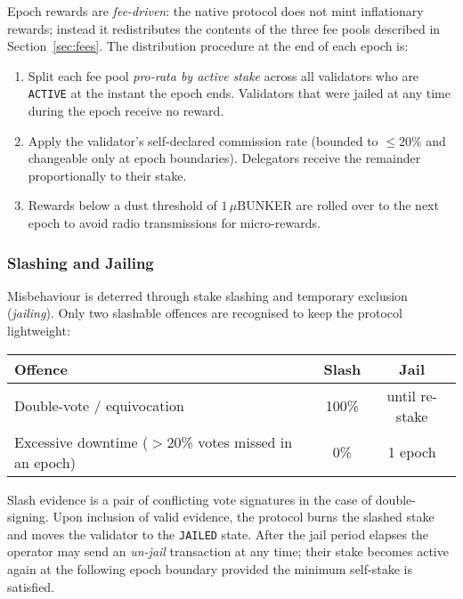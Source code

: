 \documentclass{article}
\begin{document}
Epoch rewards are \emph{fee-driven}: the native protocol does not mint inflationary rewards; instead it redistributes the contents of the three fee pools described in Section~\ref{sec:fees}.  The distribution procedure at the end of each epoch is:

\begin{enumerate}
    \item Split each fee pool \emph{pro-rata by active stake} across all validators who are \texttt{ACTIVE} at the instant the epoch ends.  Validators that were jailed at any time during the epoch receive no reward.
    \item Apply the validator’s self-declared commission rate (bounded to $\le 20\%$ and changeable only at epoch boundaries).  Delegators receive the remainder proportionally to their stake.
    \item Rewards below a dust threshold of $1\,\mu$BUNKER are rolled over to the next epoch to avoid radio transmissions for micro-rewards.
\end{enumerate}

\subsubsection{Slashing and Jailing}
\label{sec:slashing}

Misbehaviour is deterred through stake slashing and temporary exclusion (\emph{jailing}).  Only two slashable offences are recognised to keep the protocol lightweight:

\begin{center}
\begin{tabular}{l c c}
\textbf{Offence} & \textbf{Slash} & \textbf{Jail}\;\\\hline
Double-vote / equivocation & 100\% & until re-stake \\
Excessive downtime ($>$20\% votes missed in an epoch) & 0\% & 1 epoch \\
\end{tabular}
\end{center}

Slash evidence is a pair of conflicting vote signatures in the case of double-signing. Upon inclusion of valid evidence, the protocol burns the slashed stake and moves the validator to the \texttt{JAILED} state.  After the jail period elapses the operator may send an \emph{un-jail} transaction at any time; their stake becomes active again at the following epoch boundary provided the minimum self-stake is satisfied.
\end{document}
